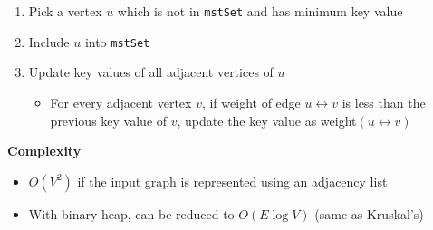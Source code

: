 \documentclass{article}
\begin{document}
\begin{multicols}{2}
\begin{enumerate}
    \begin{enumerate}
    	\item Pick a vertex $u$ which is not in \texttt{mstSet} and has minimum key value
    	\item Include $u$ into \texttt{mstSet}
    	\item Update key values of all adjacent vertices of $u$
    	\begin{itemize}
    		\item For every adjacent vertex $v$, if weight of edge $u\leftrightarrow v$ is less than the previous key value of $v$, update the key value as weight$(u\leftrightarrow v)$
    	\end{itemize}
    \end{enumerate}
\end{enumerate}
\textbf{Complexity}
\begin{itemize}
	\item $O(V^2)$ if the input graph is represented using an adjacency list
	\item With binary heap, can be reduced to $O(E\log{V})$ (same as Kruskal's)
\end{itemize}


\end{multicols}
\end{document}
